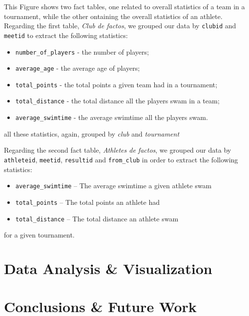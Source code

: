 \documentclass[a4paper, 11pt]{article}
\begin{document}
This Figure shows two fact tables, one related to overall statistics of a team in a tournament, while the other
ontaining the overall statistics of an athlete.
Regarding the first table, \textit{Club de factos}, we grouped our data by \texttt{clubid} and \texttt{meetid} to extract
the following statistics:

\begin{itemize}
    \item \texttt{number\_of\_players} - the number of players;
    \item \texttt{average\_age} - the average age of players;
    \item \texttt{total\_points} - the total points a given team had in a tournament;
    \item \texttt{total\_distance} - the total distance all the players swam in a team;
    \item \texttt{average\_swimtime} - the average swimtime all the players swam.
\end{itemize}

all these statistics, again, grouped by \textit{club} and \textit{tournament}

Regarding the second fact table, \textit{Athletes de factos}, we grouped our data by \texttt{athleteid}, \texttt{meetid},
\texttt{resultid} and \texttt{from\_club} in order to extract the following statistics:

\begin{itemize}
    \item \texttt{average\_swimtime} -- The average swimtime a given athlete swam
    \item \texttt{total\_points} -- The total points an athlete had
    \item \texttt{total\_distance} -- The total distance an athlete swam
\end{itemize}

for a given tournament.

\pagebreak

\section{Data Analysis \& Visualization} \label{sec:analysis}


\pagebreak

\section{Conclusions \& Future Work} \label{sec:conclusion}
\end{document}
